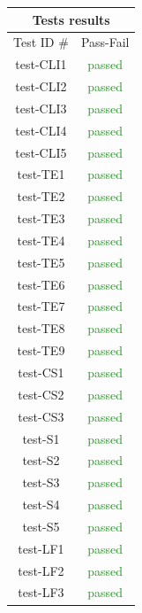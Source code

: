 \documentclass[12pt, titlepage]{article}
\begin{document}
\begin{table}[H]
    \centering
    \begin{tabular}{|c|c|}
\hline
\multicolumn{2}{|c|}{Tests results} \\ \hline
Test ID \# & Pass-Fail \\ \hline
test-CLI1 & \textcolor{ForestGreen}{passed} \\ \hline
test-CLI2 & \textcolor{ForestGreen}{passed} \\ \hline
test-CLI3 & \textcolor{ForestGreen}{passed} \\ \hline
test-CLI4 & \textcolor{ForestGreen}{passed} \\ \hline
test-CLI5 & \textcolor{ForestGreen}{passed} \\ \hline
test-TE1 & \textcolor{ForestGreen}{passed} \\ \hline
test-TE2 & \textcolor{ForestGreen}{passed} \\ \hline
test-TE3 & \textcolor{ForestGreen}{passed} \\ \hline
test-TE4 & \textcolor{ForestGreen}{passed} \\ \hline
test-TE5 & \textcolor{ForestGreen}{passed} \\ \hline
test-TE6 & \textcolor{ForestGreen}{passed} \\ \hline
test-TE7 & \textcolor{ForestGreen}{passed} \\ \hline
test-TE8 & \textcolor{ForestGreen}{passed} \\ \hline
test-TE9 & \textcolor{ForestGreen}{passed} \\ \hline
test-CS1 & \textcolor{ForestGreen}{passed} \\ \hline
test-CS2 & \textcolor{ForestGreen}{passed} \\ \hline
test-CS3 & \textcolor{ForestGreen}{passed} \\ \hline
test-S1 & \textcolor{ForestGreen}{passed} \\ \hline
test-S2 & \textcolor{ForestGreen}{passed} \\ \hline
test-S3 & \textcolor{ForestGreen}{passed} \\ \hline
test-S4 & \textcolor{ForestGreen}{passed} \\ \hline
test-S5 & \textcolor{ForestGreen}{passed} \\ \hline
test-LF1 & \textcolor{ForestGreen}{passed} \\ \hline
test-LF2 & \textcolor{ForestGreen}{passed} \\ \hline
test-LF3 & \textcolor{ForestGreen}{passed} \\ \hline

\end{tabular}
\end{table}
\end{document}
